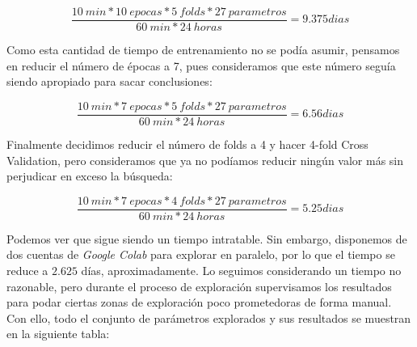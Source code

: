 \documentclass[11pt]{article}
\begin{document}
$$\frac{10 \:  min * 10 \: epocas * 5 \: folds * 27 \: parametros}{60 \: min * 24 \: horas} = 9.375 dias$$

Como esta cantidad de tiempo de entrenamiento no se podía asumir, pensamos en reducir el número de épocas a 7, pues consideramos que este número seguía siendo apropiado para sacar conclusiones:

$$\frac{10 \:  min * 7 \: epocas * 5 \: folds * 27 \: parametros}{60 \: min * 24 \: horas} = 6.56 dias$$

Finalmente decidimos reducir el número de folds a 4 y hacer 4-fold Cross Validation, pero consideramos que ya no podíamos reducir ningún valor más sin perjudicar en exceso la búsqueda:

$$\frac{10 \:  min * 7 \: epocas * 4 \: folds * 27 \: parametros}{60 \: min * 24 \: horas} = 5.25 dias$$

Podemos ver que sigue siendo un tiempo intratable. Sin embargo, disponemos de dos cuentas de \emph{Google Colab} para explorar en paralelo, por lo que el tiempo se reduce a $2.625$ días, aproximadamente. Lo seguimos considerando un tiempo no razonable, pero durante el proceso de exploración supervisamos los resultados para podar ciertas zonas de exploración poco prometedoras de forma manual. Con ello, todo el conjunto de parámetros explorados y sus resultados se muestran en la siguiente tabla:
\end{document}
